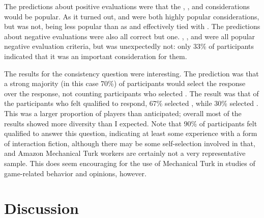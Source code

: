 The predictions about positive evaluations were that the , , and  considerations would be popular.
%
As it turned out,  and  were both highly popular considerations, but  was not, being less popular than as  and effectively tied with .
%
The predictions about negative evaluations were also all correct but one.
%
, , and  were all popular negative evaluation criteria, but  was unexpectedly not: only 33\% of participants indicated that it was an important consideration for them.


The results for the consistency question were interesting.
%
The prediction was that a strong majority (in this case 70\%) of participants would select the  response over the  response, not counting participants who selected .
%
The result was that of the participants who felt qualified to respond, 67\% selected , while 30\% selected .
%
This was a larger proportion of  players than anticipated; overall most of the results showed more diversity than I expected.
%
Note that 90\% of participants felt qualified to answer this question, indicating at least some experience with a form of interaction fiction, although there may be some self-selection involved in that, and Amazon Mechanical Turk workers are certainly not a very representative sample.
%
This does seem encouraging for the use of Mechanical Turk in studies of game-related behavior and opinions, however.


\section{Discussion}

\label{sec:e2-discussion}

